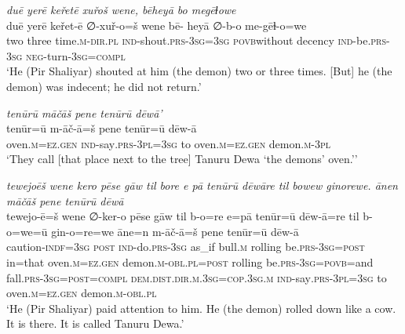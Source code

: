 \ea \label{ŽP.194}
\textit{duē yerē keřetē xuřoš wene, bēheyā bo megēɫowe} \\ 
\gll duē yerē keřet-ē ∅-xuř-o=š wene bē- heyā ∅-b-o me-gēɫ-o=we \\ 
 two three time\textsc{.m}\textsc{-dir}\textsc{.pl} \textsc{ind-}shout\textsc{.prs}\textsc{-3sg}\textsc{=3sg} \textsc{povb}without decency \textsc{ind-}be\textsc{.prs}\textsc{-3sg} \textsc{neg-}turn\textsc{-3sg}\textsc{=compl} \\ 
\glt `He (Pir Shaliyar) shouted at him (the demon) two or three times. [But] he (the demon) was indecent; he did not return.'
\z 
 
\ea \label{ŽP.196}
\textit{tenūrū māčāš pene tenūrū dēwā’} \\ 
\gll tenūr=ū m-āč-ā=š pene tenūr=ū dēw-ā \\ 
 oven\textsc{.m}\textsc{\textsc{=ez.gen}} \textsc{ind-}say\textsc{.prs}\textsc{-3pl}\textsc{=3sg} to oven\textsc{.m}\textsc{\textsc{=ez.gen}} demon\textsc{.m}\textsc{-3pl} \\ 
\glt `They call [that place next to the tree] Tanuru Dewa ‘the demons’ oven.’'
\z 
 
\ea \label{ŽP.200}
\textit{tewejoēš wene kero pēse gāw til bore e pā tenūrū dēwāre til bowew ginorewe. ānen māčāš pene tenūrū dēwā} \\ 
\gll tewejo-ē=š wene ∅-ker-o pēse gāw til b-o=re e=pā tenūr=ū dēw-ā=re til b-o=we=ū gin-o=re=we āne=n m-āč-ā=š pene tenūr=ū dēw-ā \\ 
 caution\textsc{-indf}\textsc{=3sg} \textsc{post} \textsc{ind-}do\textsc{.prs}\textsc{-3sg} as\_if bull\textsc{.m} rolling be\textsc{.prs}\textsc{-3sg}\textsc{=\textsc{post}} in=that oven\textsc{.m}\textsc{\textsc{=ez.gen}} demon\textsc{.m}\textsc{-obl}\textsc{.pl}\textsc{=\textsc{post}} rolling be\textsc{.prs}\textsc{-3sg}\textsc{=\textsc{povb}}=and fall\textsc{.prs}\textsc{-3sg}\textsc{=\textsc{post}}\textsc{=compl} \textsc{dem.dist}\textsc{.dir}\textsc{.m}\textsc{.3sg}\textsc{=cop}\textsc{.3sg}\textsc{.m} \textsc{ind-}say\textsc{.prs}\textsc{-3pl}\textsc{=3sg} to oven\textsc{.m}\textsc{\textsc{=ez.gen}} demon\textsc{.m}\textsc{-obl}\textsc{.pl} \\ 
\glt `He (Pir Shaliyar) paid attention to him. He (the demon) rolled down like a cow. It is there. It is called Tanuru Dewa.'
\z 
 
